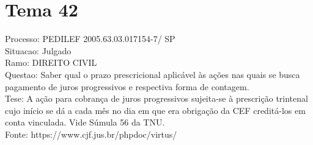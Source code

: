 \documentclass[12pt]{article}
\begin{document}
\section*{Tema 42}
Processo: PEDILEF 2005.63.03.017154-7/ SP\\
Situacao: Julgado\\
Ramo: DIREITO CIVIL\\
Questao: Saber qual o prazo prescricional aplicável às ações nas quais se busca pagamento de juros progressivos e respectiva forma de contagem.\\
Tese: A ação para cobrança de juros progressivos sujeita-se à prescrição trintenal cujo início se dá a cada mês no dia em que era obrigação da CEF creditá-los em conta vinculada. Vide Súmula 56 da TNU.\\
Fonte: https://www.cjf.jus.br/phpdoc/virtus/
\end{document}
